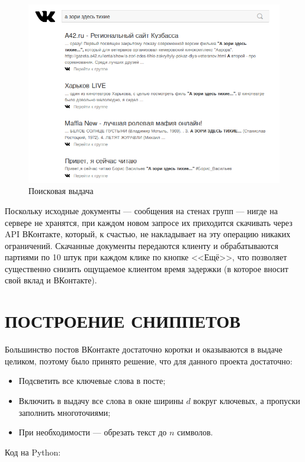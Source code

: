 \documentclass[14pt, a4paper]{extreport}
\begin{document}
\begin{figure}[!htb]
  \centering
  \includegraphics[scale=0.45]{pics/results.png}
  \caption{Поисковая выдача}
  \label{fig:results}
\end{figure}

Поскольку исходные документы --- сообщения на стенах групп --- нигде на сервере не хранятся, при каждом новом запросе их приходится скачивать через API ВКонтакте, который, к счастью, не накладывает на эту операцию никаких ограничений. Скачанные документы передаются клиенту и обрабатываются партиями по 10 штук при каждом клике по кнопке <<Ещё>>, что позволяет существенно снизить ощущаемое клиентом время задержки (в которое вносит свой вклад и ВКонтакте).


\chapter{\MakeTextUppercase{Построение сниппетов}}

Большинство постов ВКонтакте достаточно коротки и оказываются в выдаче целиком, поэтому было принято решение, что для данного проекта достаточно:
\begin{itemize}
  \item Подсветить все ключевые слова в посте;
  \item Включить в выдачу все слова в окне ширины $d$ вокруг ключевых, а пропуски заполнить многоточиями;
  \item При необходимости --- обрезать текст до $n$ символов.
\end{itemize}

Код на Python:
\end{document}
